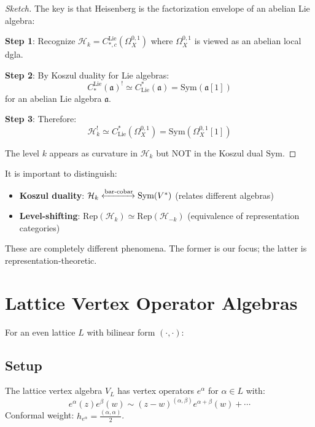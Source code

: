 \begin{proof}[Sketch]
The key is that Heisenberg is the factorization envelope of an abelian Lie algebra:

\textbf{Step 1}: Recognize $\mathcal{H}_k = C_{*,c}^{\text{Lie}}(\Omega^{0,1}_X)$ where $\Omega^{0,1}_X$ is viewed as an abelian local dgla.

\textbf{Step 2}: By Koszul duality for Lie algebras:
$$C_*^{\text{Lie}}(\mathfrak{a})^! \simeq C^*_{\text{Lie}}(\mathfrak{a}) = \text{Sym}(\mathfrak{a}[1])$$
for an abelian Lie algebra $\mathfrak{a}$.

\textbf{Step 3}: Therefore:
$$\mathcal{H}_k^! \simeq C^*_{\text{Lie}}(\Omega^{0,1}_X) = \text{Sym}(\Omega^{0,1}_X[1])$$

The level $k$ appears as curvature in $\mathcal{H}_k$ but NOT in the Koszul dual $\text{Sym}$.
\end{proof}

\begin{remark}
It is important to distinguish:
\begin{itemize}
\item \textbf{Koszul duality}: $\mathcal{H}_k \xleftrightarrow{\text{bar-cobar}} \text{Sym}(V^*)$ (relates different algebras)
\item \textbf{Level-shifting}: $\text{Rep}(\mathcal{H}_k) \simeq \text{Rep}(\mathcal{H}_{-k})$ (equivalence of representation categories)
\end{itemize}
These are completely different phenomena. The former is our focus; the latter is representation-theoretic.
\end{remark}
 
\section{Lattice Vertex Operator Algebras}
 
For an even lattice $L$ with bilinear form $(\cdot, \cdot)$:
 
\subsection{Setup}
 
\begin{definition}
The lattice vertex algebra $V_L$ has vertex operators $e^\alpha$ for $\alpha \in L$ with:
\[
e^\alpha(z)e^\beta(w) \sim (z-w)^{(\alpha,\beta)} e^{\alpha+\beta}(w) + \cdots
\]
Conformal weight: $h_{e^\alpha} = \frac{(\alpha,\alpha)}{2}$.
\end{definition}
 
